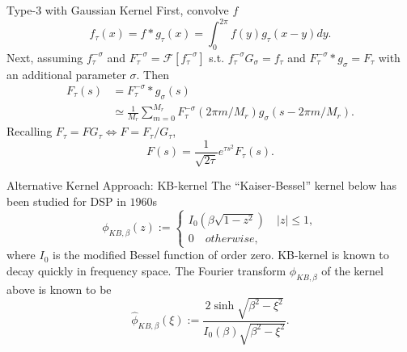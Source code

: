 \documentclass{beamer}
\begin{document}
\begin{frame}{Type-$3$ with Gaussian Kernel}
  First, convolve $f$ 
  \begin{equation}
      f_{\tau}(x) = f\ast g_{\tau} (x) = \int_{0}^{2\pi} f(y)g_{\tau}(x-y) dy.
  \end{equation}
  Next, assuming $f_{\tau}^{-\sigma}$ and $F_{\tau}^{-\sigma} = \mathcal{F}[f_{\tau}^{-\sigma}]$
  s.t. 
  $f_{\tau}^{-\sigma}G_{\sigma} = f_{\tau}$ and $F_{\tau}^{-\sigma}\ast g_{\sigma} = F_{\tau}$
  with an additional parameter $\sigma$. Then 
  \begin{align}
    F_{\tau}(s) &= F_{\tau}^{-\sigma}\ast g_{\sigma} (s) \\
    &\simeq \frac{1}{M_{r}}\sum_{m=0}^{M_{r}}
            F_{\tau}^{-\sigma}(2\pi m/M_{r})g_{\sigma}(s - 2\pi m/M_{r}).
  \end{align}
  Recalling $F_{\tau} = FG_{\tau} \Leftrightarrow F = F_{\tau}/G_{\tau}$,
  \begin{equation}
    F(s) = \frac{1}{\sqrt{2\tau}}e^{\tau s^2}F_{\tau}(s).
  \end{equation}
\end{frame}

\begin{frame}{Alternative Kernel Approach: KB-kernel}
  The ``Kaiser-Bessel'' kernel below \cite{Book-Kaiser} has been studied for DSP in $1960$s
  \begin{equation}
    \phi_{KB,\beta}(z) :=
    \begin{cases}
      I_{0}\left(\beta\sqrt{1-z^2}\right) \quad |z| \le 1,\\
      0 \quad otherwise,
    \end{cases}
    \label{eq:KB-kernel}
  \end{equation}
  where $I_{0}$ is the modified Bessel function of order zero.
  KB-kernel is known to decay quickly in frequency space.
  The Fourier transform $\phi_{KB,\beta}$ of the kernel above is known to be
  \begin{equation}
    \hat{\phi}_{KB,\beta}(\xi) :=
    \frac{2\sinh\sqrt{\beta^2-\xi^2}}{I_{0}(\beta)\sqrt{\beta^2-\xi^2}}.
    \label{eq:FT-KB-kernel}
  \end{equation}
\end{frame}
\end{document}
